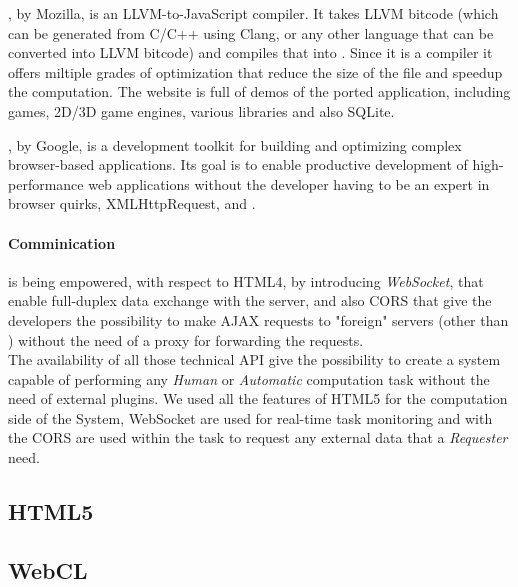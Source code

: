 , by Mozilla, is an LLVM-to-JavaScript compiler. It takes
LLVM bitcode (which can be generated from C/C++ using Clang, or any other
language that can be converted into LLVM bitcode) and compiles that into \js{}.
Since it is a compiler it offers miltiple grades of optimization that reduce the
size of the \js{} file and speedup the computation. The website is full of demos
of the ported application, including games, 2D/3D game engines, various libraries
and also SQLite.

, by Google, is a development toolkit for building and optimizing
complex browser-based applications. Its goal is to enable productive development
of high-performance web applications without the developer having to be an expert
in browser quirks, XMLHttpRequest, and \js{}.\\



\paragraph{Comminication} is being empowered, with respect to HTML4, by
introducing \emph{WebSocket}, that enable full-duplex data exchange with the server,
and also \ac{CORS} that give the developers the possibility to make \ac{AJAX}
requests to "foreign" servers (other than ) without the need of
a proxy for forwarding the requests.\\


The availability of all those technical API give the possibility to create a
system capable of performing any \emph{Human} or \emph{Automatic} computation
task without the need of external plugins. We used all the features of HTML5
for the computation side of the System, WebSocket are used for real-time task
monitoring and with the \ac{CORS} are used within the task to request any
external data that a \emph{Requester} need.

\subsection{\acs{HTML}5}
\label{sec:bg:web:html5}



\subsection{WebCL}
\label{sec:bg:web:webcl}
